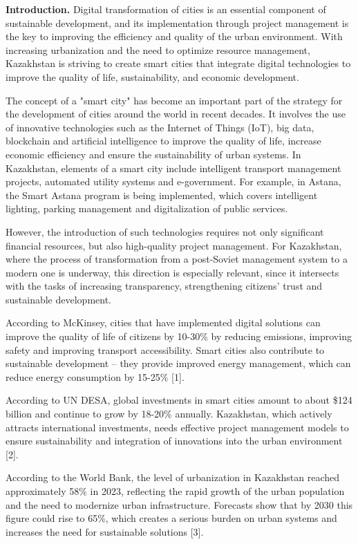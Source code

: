 {\bfseries Introduction.} Digital transformation of cities is an essential
component of sustainable development, and its implementation through
project management is the key to improving the efficiency and quality of
the urban environment. With increasing urbanization and the need to
optimize resource management, Kazakhstan is striving to create smart
cities that integrate digital technologies to improve the quality of
life, sustainability, and economic development.

The concept of a "smart city" has become an important part of the
strategy for the development of cities around the world in recent
decades. It involves the use of innovative technologies such as the
Internet of Things (IoT), big data, blockchain and artificial
intelligence to improve the quality of life, increase economic
efficiency and ensure the sustainability of urban systems. In
Kazakhstan, elements of a smart city include intelligent transport
management projects, automated utility systems and e-government. For
example, in Astana, the Smart Astana program is being implemented, which
covers intelligent lighting, parking management and digitalization of
public services.

However, the introduction of such technologies requires not only
significant financial resources, but also high-quality project
management. For Kazakhstan, where the process of transformation from a
post-Soviet management system to a modern one is underway, this
direction is especially relevant, since it intersects with the tasks of
increasing transparency, strengthening citizens'{} trust
and sustainable development.

According to McKinsey, cities that have implemented digital solutions
can improve the quality of life of citizens by 10-30\% by reducing
emissions, improving safety and improving transport accessibility. Smart
cities also contribute to sustainable development -- they provide
improved energy management, which can reduce energy consumption by
15-25\% {[}1{]}.

According to UN DESA, global investments in smart cities amount to about
\$124 billion and continue to grow by 18-20\% annually. Kazakhstan,
which actively attracts international investments, needs effective
project management models to ensure sustainability and integration of
innovations into the urban environment {[}2{]}.

According to the World Bank, the level of urbanization in Kazakhstan
reached approximately 58\% in 2023, reflecting the rapid growth of the
urban population and the need to modernize urban infrastructure.
Forecasts show that by 2030 this figure could rise to 65\%, which
creates a serious burden on urban systems and increases the need for
sustainable solutions {[}3{]}.

